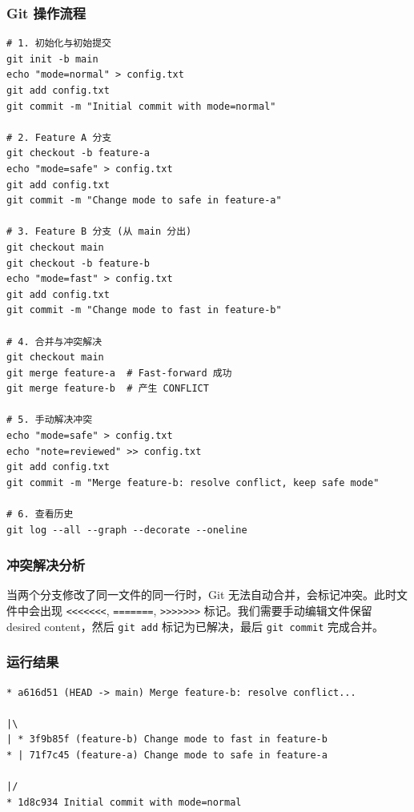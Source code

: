 \documentclass[12pt,a4paper]{article}
\begin{document}
\subsubsection{Git 操作流程}
\begin{lstlisting}[caption={Git 操作指令序列}]
# 1. 初始化与初始提交
git init -b main
echo "mode=normal" > config.txt
git add config.txt
git commit -m "Initial commit with mode=normal"

# 2. Feature A 分支
git checkout -b feature-a
echo "mode=safe" > config.txt
git add config.txt
git commit -m "Change mode to safe in feature-a"

# 3. Feature B 分支 (从 main 分出)
git checkout main
git checkout -b feature-b
echo "mode=fast" > config.txt
git add config.txt
git commit -m "Change mode to fast in feature-b"

# 4. 合并与冲突解决
git checkout main
git merge feature-a  # Fast-forward 成功
git merge feature-b  # 产生 CONFLICT

# 5. 手动解决冲突
echo "mode=safe" > config.txt
echo "note=reviewed" >> config.txt
git add config.txt
git commit -m "Merge feature-b: resolve conflict, keep safe mode"

# 6. 查看历史
git log --all --graph --decorate --oneline
\end{lstlisting}

\subsubsection{冲突解决分析}
\begin{infobox}[原理说明]
当两个分支修改了同一文件的同一行时，Git 无法自动合并，会标记冲突。此时文件中会出现 \texttt{<<<<<<<}, \texttt{=======}, \texttt{>>>>>>>} 标记。我们需要手动编辑文件保留 desired content，然后 \texttt{git add} 标记为已解决，最后 \texttt{git commit} 完成合并。
\end{infobox}

\subsubsection{运行结果}
\begin{lstlisting}[caption={Git Log 图形化输出}]
* a616d51 (HEAD -> main) Merge feature-b: resolve conflict...

|\
| * 3f9b85f (feature-b) Change mode to fast in feature-b
* | 71f7c45 (feature-a) Change mode to safe in feature-a

|/
* 1d8c934 Initial commit with mode=normal
\end{lstlisting}
\end{document}
